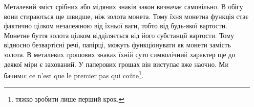 Металевий зміст срібних або мідяних знаків закон визначає
самовільно. В обігу вони стираються ще швидше, ніж золота
монета. Тому їхня монетна функція стає фактично цілком незалежною
від їхньої ваги, тобто від будь-якої вартости. Монетне
буття золота цілком відділяється від його субстанції вартости.
Тому відносно безвартісні речі, папірці, можуть функціонувати
як монети замість золота. В металевих грошових знаках їхній
суто символічний характер ще до деякої міри є захований. У паперових
грошах він виступає вже наочно. Ми бачимо: ce n’est que
le premier pas qui coûte\footnote*{
тяжко зробити лише перший крок. 
}.
